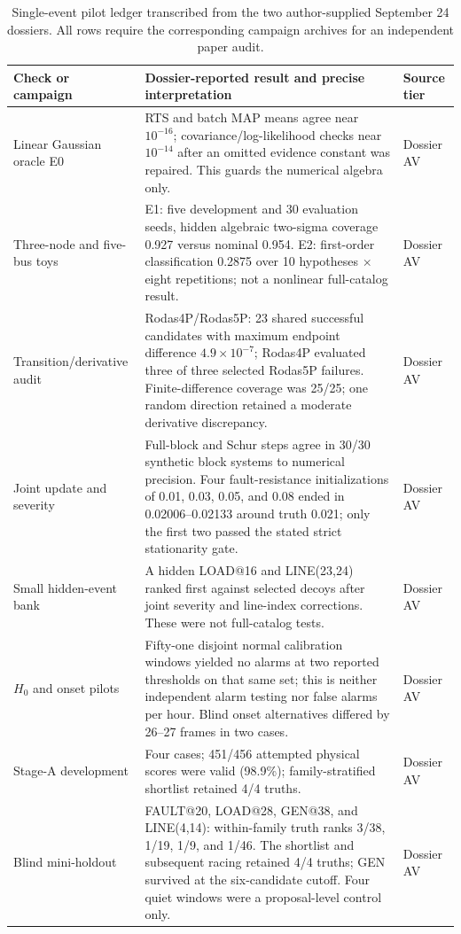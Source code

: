 \begin{table}[t]
\caption{Single-event pilot ledger transcribed from the two author-supplied September 24 dossiers. All rows require the corresponding campaign archives for an independent paper audit.}
\label{tab:pilot-numerical-ledger}
\centering\scriptsize
\begin{tabularx}{\textwidth}{@{}p{2.6cm}Xp{2.15cm}@{}}
\toprule
Check or campaign & Dossier-reported result and precise interpretation & Source tier \\
\midrule
Linear Gaussian oracle E0 & RTS and batch MAP means agree near $10^{-16}$; covariance/log-likelihood checks near $10^{-14}$ after an omitted evidence constant was repaired. This guards the numerical algebra only. & Dossier AV \\
Three-node and five-bus toys & E1: five development and 30 evaluation seeds, hidden algebraic two-sigma coverage 0.927 versus nominal 0.954. E2: first-order classification 0.2875 over 10 hypotheses $\times$ eight repetitions; not a nonlinear full-catalog result. & Dossier AV \\
Transition/derivative audit & Rodas4P/Rodas5P: 23 shared successful candidates with maximum endpoint difference $4.9\times10^{-7}$; Rodas4P evaluated three of three selected Rodas5P failures. Finite-difference coverage was 25/25; one random direction retained a moderate derivative discrepancy. & Dossier AV \\
Joint update and severity & Full-block and Schur steps agree in 30/30 synthetic block systems to numerical precision. Four fault-resistance initializations of 0.01, 0.03, 0.05, and 0.08 ended in 0.02006--0.02133 around truth 0.021; only the first two passed the stated strict stationarity gate. & Dossier AV \\
Small hidden-event bank & A hidden LOAD@16 and LINE(23,24) ranked first against selected decoys after joint severity and line-index corrections. These were not full-catalog tests. & Dossier AV \\
$H_0$ and onset pilots & Fifty-one disjoint normal calibration windows yielded no alarms at two reported thresholds on that same set; this is neither independent alarm testing nor false alarms per hour. Blind onset alternatives differed by 26--27 frames in two cases. & Dossier AV \\
Stage-A development & Four cases; 451/456 attempted physical scores were valid (98.9\%); family-stratified shortlist retained 4/4 truths. & Dossier AV \\
Blind mini-holdout & FAULT@20, LOAD@28, GEN@38, and LINE(4,14): within-family truth ranks 3/38, 1/19, 1/9, and 1/46. The shortlist and subsequent racing retained 4/4 truths; GEN survived at the six-candidate cutoff. Four quiet windows were a proposal-level control only. & Dossier AV \\

\end{tabularx}
\end{table}
